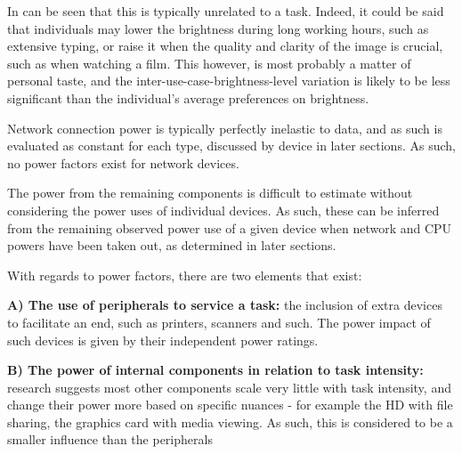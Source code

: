 \documentclass[conference]{IEEEtran}
\begin{document}
In can be seen that this is typically unrelated to a task. Indeed, it
could be said that individuals may lower the brightness during long
working hours, such as extensive typing, or raise it when the quality
and clarity of the image is crucial, such as when watching a
film. This however, is most probably a matter of personal taste, and
the inter-use-case-brightness-level variation is likely to be less
significant than the individual’s average preferences on brightness.


Network connection power is typically perfectly inelastic to data, and
as such is evaluated as constant for each type, discussed by device in
later sections. As such, no power factors exist for network devices.


The power from the remaining components is difficult to estimate
without considering the power uses of individual devices. As such,
these can be inferred from the remaining observed power use of a given
device when network and CPU powers have been taken out, as determined
in later sections.

With regards to power factors, there are two elements that exist:

{\textbf{A) The use of peripherals to service a task:}} the inclusion of extra
devices to facilitate an end, such as printers, scanners and such. The
power impact of such devices is given by their independent power
ratings.

{\textbf{B) The power of internal components in relation to task
    intensity:}} research suggests most other components scale very little with task
intensity, and change their power more based on specific nuances - for
example the HD with file sharing, the graphics card with media
viewing. As such, this is considered to be a smaller influence than
the peripherals

\end{document}

